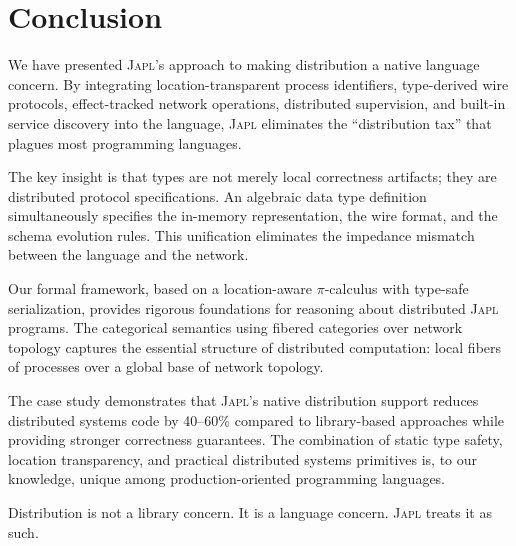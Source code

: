 \documentclass[11pt,a4paper]{article}
\newcommand{\japl}{\textsc{Japl}}
\begin{document}
\section{Conclusion}
\label{sec:conclusion}

We have presented \japl{}'s approach to making distribution a native
language concern. By integrating location-transparent process identifiers,
type-derived wire protocols, effect-tracked network operations, distributed
supervision, and built-in service discovery into the language, \japl{}
eliminates the ``distribution tax'' that plagues most programming languages.

The key insight is that types are not merely local correctness artifacts;
they are distributed protocol specifications. An algebraic data type
definition simultaneously specifies the in-memory representation, the wire
format, and the schema evolution rules. This unification eliminates the
impedance mismatch between the language and the network.

Our formal framework, based on a location-aware $\pi$-calculus with
type-safe serialization, provides rigorous foundations for reasoning about
distributed \japl{} programs. The categorical semantics using fibered
categories over network topology captures the essential structure of
distributed computation: local fibers of processes over a global base of
network topology.

The case study demonstrates that \japl{}'s native distribution support
reduces distributed systems code by 40--60\% compared to library-based
approaches while providing stronger correctness guarantees. The combination
of static type safety, location transparency, and practical distributed
systems primitives is, to our knowledge, unique among production-oriented
programming languages.

Distribution is not a library concern. It is a language concern. \japl{}
treats it as such.



\end{document}
